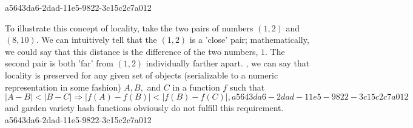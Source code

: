 \documentclass[12pt]{article}
\begin{document}
a5643da6-2dad-11e5-9822-3c15c2c7a012\par To illustrate this concept of locality, take the two pairs of numbers $(1,2)$ and $(8,10)$. We can intuitively tell that the $(1,2)$ is a 'close' pair; mathematically, we could say that this distance is the difference of the two numbers, $1$. The second pair is both 'far' from $(1,2)$ individually farther apart. , we can say that locality is preserved for any given set of objects (serializable to a numeric representation in some fashion) $A,B,$ and $C$ in a function $f$ such that
\begin{equation}
|A-B| < |B-C| \Rightarrow |f(A)-f(B)| < |f(B) - f(C)|,
a5643da6-2dad-11e5-9822-3c15c2c7a012\end{equation}
and garden variety hash functions obviously do not fulfill this requirement.
a5643da6-2dad-11e5-9822-3c15c2c7a012
\printbibliography
\end{document}
